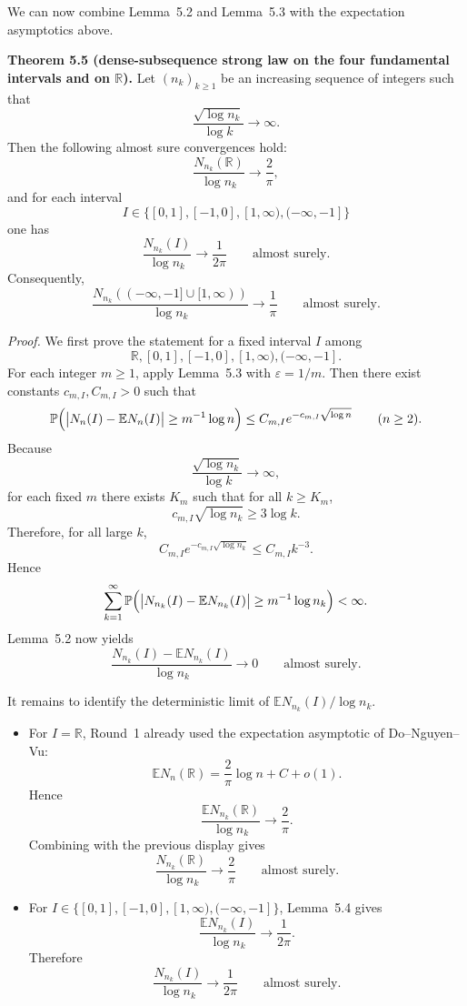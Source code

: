 We can now combine Lemma~5.2 and Lemma~5.3 with the expectation asymptotics above.

\medskip
\noindent\textbf{Theorem 5.5 (dense-subsequence strong law on the four fundamental intervals and on $\mathbb R$).}
Let $(n_k)_{k\ge1}$ be an increasing sequence of integers such that
\[
\frac{\sqrt{\log n_k}}{\log k}\to\infty.
\]
Then the following almost sure convergences hold:
\[
\frac{N_{n_k}(\mathbb R)}{\log n_k}\to\frac{2}{\pi},
\]
and for each interval
\[
I\in\{[0,1],[-1,0],[1,\infty),(-\infty,-1]\}
\]
one has
\[
\frac{N_{n_k}(I)}{\log n_k}\to\frac{1}{2\pi}
\qquad\text{almost surely.}
\]
Consequently,
\[
\frac{N_{n_k}((-\infty,-1]\cup[1,\infty))}{\log n_k}\to\frac{1}{\pi}
\qquad\text{almost surely.}
\]

\medskip
\noindent\emph{Proof.}
We first prove the statement for a fixed interval $I$ among
\[
\mathbb R,[0,1],[-1,0],[1,\infty),(-\infty,-1].
\]
For each integer $m\ge1$, apply Lemma~5.3 with $\varepsilon=1/m$. Then there exist constants $c_{m,I},C_{m,I}>0$ such that
\[
\mathbb P\Bigl(\bigl|N_n(I)-\mathbb E N_n(I)\bigr|\ge m^{-1}\log n\Bigr)
\le C_{m,I}e^{-c_{m,I}\sqrt{\log n}}
\qquad(n\ge2).
\]
Because
\[
\frac{\sqrt{\log n_k}}{\log k}\to\infty,
\]
for each fixed $m$ there exists $K_m$ such that for all $k\ge K_m$,
\[
c_{m,I}\sqrt{\log n_k}\ge 3\log k.
\]
Therefore, for all large $k$,
\[
C_{m,I}e^{-c_{m,I}\sqrt{\log n_k}}
\le C_{m,I}k^{-3}.
\]
Hence
\[
\sum_{k=1}^\infty
\mathbb P\Bigl(\bigl|N_{n_k}(I)-\mathbb E N_{n_k}(I)\bigr|\ge m^{-1}\log n_k\Bigr)<\infty.
\]
Lemma~5.2 now yields
\[
\frac{N_{n_k}(I)-\mathbb E N_{n_k}(I)}{\log n_k}\to0
\qquad\text{almost surely.}
\]

It remains to identify the deterministic limit of $\mathbb E N_{n_k}(I)/\log n_k$.

\begin{itemize}
\item For $I=\mathbb R$, Round~1 already used the expectation asymptotic of Do--Nguyen--Vu:
\[
\mathbb E N_n(\mathbb R)=\frac{2}{\pi}\log n + C + o(1).
\]
Hence
\[
\frac{\mathbb E N_{n_k}(\mathbb R)}{\log n_k}\to \frac{2}{\pi}.
\]
Combining with the previous display gives
\[
\frac{N_{n_k}(\mathbb R)}{\log n_k}\to\frac{2}{\pi}
\qquad\text{almost surely.}
\]

\item For $I\in\{[0,1],[-1,0],[1,\infty),(-\infty,-1]\}$, Lemma~5.4 gives
\[
\frac{\mathbb E N_{n_k}(I)}{\log n_k}\to \frac{1}{2\pi}.
\]
Therefore
\[
\frac{N_{n_k}(I)}{\log n_k}\to\frac{1}{2\pi}
\qquad\text{almost surely.}
\]
\end{itemize}

